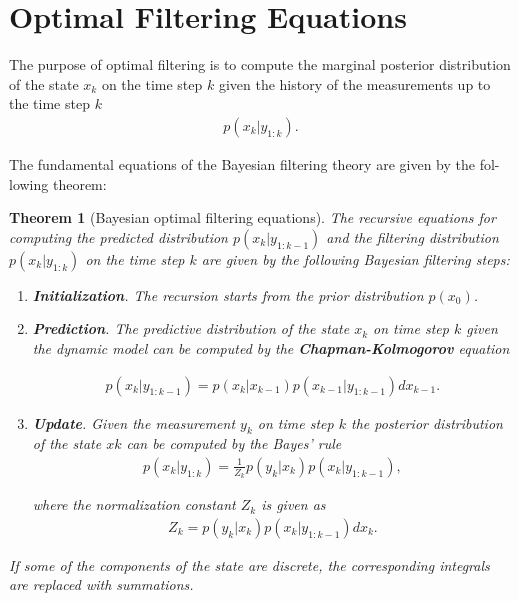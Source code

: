 \section{Optimal Filtering Equations}
The purpose of optimal filtering is to compute the marginal posterior distribution
of the state $x_k$ on the time step $k$ given the history of the measurements up to the
time step $k$
\begin{eqnarray} \label{eqn: Optimal Filtering Equations}
p(x_k | y_{1:k} ). 
\end{eqnarray} 

The fundamental equations of the Bayesian filtering theory are given by the fol-
lowing theorem:
\newtheorem{thm3}{Theorem}[section]

\begin{thm3} [Bayesian optimal filtering equations]
The recursive equations for computing the predicted distribution $p(x_k | y_{1:k-1})$ and the filtering distribution $p(x_k | y_{1:k})$ on the time step $k$ are given by the following Bayesian filtering steps:
\begin{enumerate}
\item \textbf{Initialization}. The recursion starts from the prior distribution $p(x_0 )$.
\item \textbf{Prediction}. The predictive distribution of the state $x_k$ on time step $k$ given the dynamic model can be computed by the \textbf{Chapman-Kolmogorov} equation

\begin{eqnarray} \label{eqn: Prediction Step}
p(x_k | y_{1:k-1} ) =p(x_k | x_{k-1} ) p(x_{k-1} | y_{1:k-1} ) dx_{k-1} .
\end{eqnarray}

\item \textbf{Update}. Given the measurement $y_k$ on time step $k$ the posterior distribution of the state $xk$ can be computed by the Bayes’ rule
\begin{eqnarray} \label{eqn: Update Step}
p(x_k | y_{1:k} ) = \frac{1}{Z_k} p(y_k | x_k ) p(x_k | y_{1:k-1} ),
\end{eqnarray}

where the normalization constant $Z_k$ is given as
\begin{eqnarray} \label{eqn: Normalization}
Z_k = p(y_k | x_k ) p(x_k | y_{1:k-1} ) dx_k .
\end{eqnarray}
\end{enumerate}

If some of the components of the state are discrete, the corresponding integrals are
replaced with summations.
\end{thm3}

